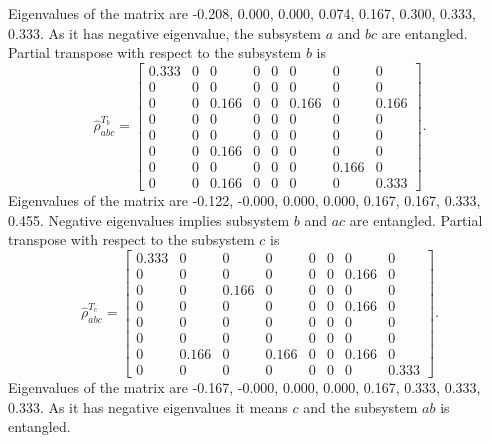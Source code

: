 \documentclass{scrartcl}
\begin{document}
Eigenvalues of the matrix are -0.208, 0.000, 0.000, 0.074, 0.167, 0.300, 0.333, 0.333. As it has negative eigenvalue, the subsystem $a$ and $bc$ are entangled.
Partial transpose with respect to the subsystem $b$ is
\begin{equation*}
	\hat{\rho}_{abc}^{T_b} = \left[\begin{matrix}0.333 & 0 & 0 & 0 & 0 & 0 & 0 & 0\\0 & 0 & 0 & 0 & 0 & 0 & 0 & 0\\0 & 0 & 0.166 & 0 & 0 & 0.166 & 0 & 0.166\\0 & 0 & 0 & 0 & 0 & 0 & 0 & 0\\0 & 0 & 0 & 0 & 0 & 0 & 0 & 0\\0 & 0 & 0.166 & 0 & 0 & 0 & 0 & 0\\0 & 0 & 0 & 0 & 0 & 0 & 0.166 & 0\\0 & 0 & 0.166 & 0 & 0 & 0 & 0 & 0.333\end{matrix}\right]
	.
\end{equation*}
Eigenvalues of the matrix are -0.122, -0.000, 0.000, 0.000, 0.167, 0.167, 0.333, 0.455. Negative eigenvalues implies subsystem $b$ and $ac$ are entangled.
Partial transpose with respect to the subsystem $c$ is
\begin{equation*}
	\hat{\rho}_{abc}^{T_c} = \left[\begin{matrix}0.333 & 0 & 0 & 0 & 0 & 0 & 0 & 0\\0 & 0 & 0 & 0 & 0 & 0 & 0.166 & 0\\0 & 0 & 0.166 & 0 & 0 & 0 & 0 & 0\\0 & 0 & 0 & 0 & 0 & 0 & 0.166 & 0\\0 & 0 & 0 & 0 & 0 & 0 & 0 & 0\\0 & 0 & 0 & 0 & 0 & 0 & 0 & 0\\0 & 0.166 & 0 & 0.166 & 0 & 0 & 0.166 & 0\\0 & 0 & 0 & 0 & 0 & 0 & 0 & 0.333\end{matrix}\right].
\end{equation*}
Eigenvalues of the matrix are -0.167, -0.000, 0.000, 0.000, 0.167, 0.333, 0.333, 0.333. As it has negative eigenvalues it means $c$ and the subsystem $ab$ is entangled.
\end{document}
